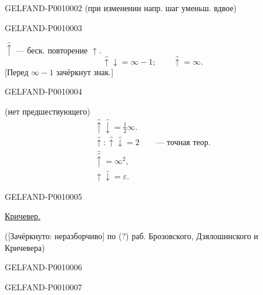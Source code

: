 \begin{GelfandAdjacentEvidence}{GELFAND-P001000}{2}
(при изменении напр. шаг уменьш. вдвое)
\end{GelfandAdjacentEvidence}
\begin{GelfandAdjacentEvidence}{GELFAND-P001000}{3}


$\hat{\uparrow}$ --- беск. повторение $\uparrow$.
\[
\hat{\uparrow}\downarrow=\infty-1;\qquad
\hat{\uparrow}=\infty.
\]
[Перед $\infty-1$ зачёркнут знак.]
\end{GelfandAdjacentEvidence}
\begin{GelfandAdjacentEvidence}{GELFAND-P001000}{4}

(нет предшествующего)
\begin{gather*}
\hat{\uparrow}\hat{\downarrow}=\frac12\infty.\\
\hat{\uparrow}:\hat{\uparrow}\hat{\downarrow}=2
\qquad\text{--- точная теор.}\\
\hat{\hat{\uparrow}}=\infty^2,\\
\uparrow\hat{\downarrow}=\varepsilon.
\end{gather*}
\end{GelfandAdjacentEvidence}
\begin{GelfandAdjacentEvidence}{GELFAND-P001000}{5}


\underline{Кричевер.}

([Зачёркнуто: неразборчиво] по (?) раб. Брозовского, Дзялошинского и Кричевера)
\end{GelfandAdjacentEvidence}
\begin{GelfandAdjacentEvidence}{GELFAND-P001000}{6}

\end{GelfandAdjacentEvidence}
\begin{GelfandAdjacentEvidence}{GELFAND-P001000}{7}

\end{GelfandAdjacentEvidence}

